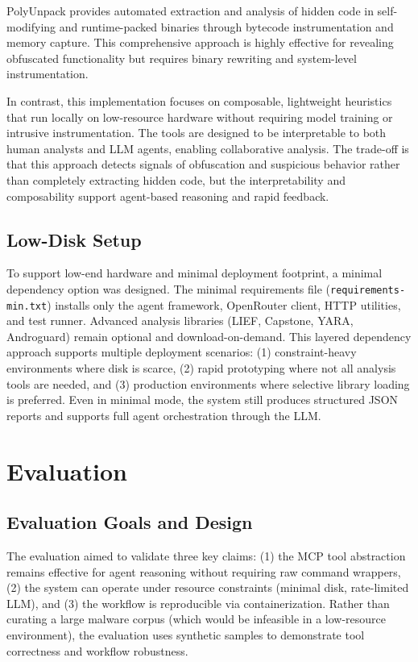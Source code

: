 \documentclass[11pt]{article}
\begin{document}
PolyUnpack provides automated extraction and analysis of hidden code in self-modifying and runtime-packed binaries through bytecode instrumentation and memory capture. This comprehensive approach is highly effective for revealing obfuscated functionality but requires binary rewriting and system-level instrumentation.

In contrast, this implementation focuses on composable, lightweight heuristics that run locally on low-resource hardware without requiring model training or intrusive instrumentation. The tools are designed to be interpretable to both human analysts and LLM agents, enabling collaborative analysis. The trade-off is that this approach detects signals of obfuscation and suspicious behavior rather than completely extracting hidden code, but the interpretability and composability support agent-based reasoning and rapid feedback.

\subsection{Low-Disk Setup}
To support low-end hardware and minimal deployment footprint, a minimal dependency option was designed. The minimal requirements file (\texttt{requirements-min.txt}) installs only the agent framework, OpenRouter client, HTTP utilities, and test runner. Advanced analysis libraries (LIEF, Capstone, YARA, Androguard) remain optional and download-on-demand. This layered dependency approach supports multiple deployment scenarios: (1) constraint-heavy environments where disk is scarce, (2) rapid prototyping where not all analysis tools are needed, and (3) production environments where selective library loading is preferred. Even in minimal mode, the system still produces structured JSON reports and supports full agent orchestration through the LLM.

\section{Evaluation}
\subsection{Evaluation Goals and Design}
The evaluation aimed to validate three key claims: (1) the MCP tool abstraction remains effective for agent reasoning without requiring raw command wrappers, (2) the system can operate under resource constraints (minimal disk, rate-limited LLM), and (3) the workflow is reproducible via containerization. Rather than curating a large malware corpus (which would be infeasible in a low-resource environment), the evaluation uses synthetic samples to demonstrate tool correctness and workflow robustness.
\end{document}
